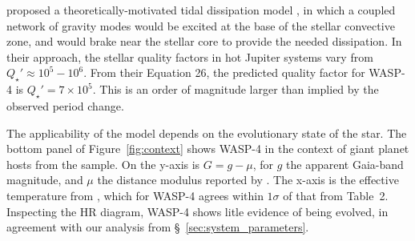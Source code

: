 \documentclass[12pt,twocolumn,tighten]{aastex62}
\begin{document}

\citet{essick_orbital_2016} proposed a theoretically-motivated tidal
dissipation model , in which a coupled network of gravity modes would
be excited at the base of the stellar convective zone, and would brake
near the stellar core to provide the needed dissipation.  In their
approach, the stellar quality factors in hot Jupiter systems vary from
$Q_\star' \approx 10^5 - 10^6$.  From their Equation 26, the predicted
quality factor for WASP-4 is $Q_\star' = 7\times10^5$.  This is an
order of magnitude larger than implied by the observed period change.

The applicability of the \citet{essick_orbital_2016} model depends on
the evolutionary state of the star.  The bottom panel of
Figure~\ref{fig:context} shows WASP-4 in the context of giant planet
hosts from the \citet{bonomo_gaps_2017} sample.  On the y-axis is
$G=g-\mu$, for $g$ the apparent Gaia-band magnitude, and $\mu$ the
distance modulus reported by \citet{gaia_collaboration_gaia_2018}.
The x-axis is the effective temperature from \citet{bonomo_gaps_2017},
which for WASP-4 agrees within $1\sigma$ of that from Table~2.
Inspecting the HR diagram, WASP-4 shows litle evidence of being
evolved, in agreement with our analysis from
\S~\ref{sec:system_parameters}.
\end{document}
